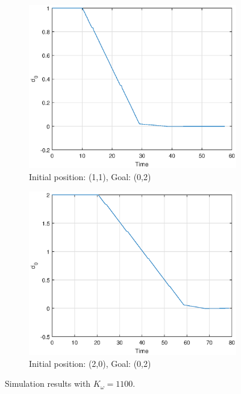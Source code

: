 \begin{figure}[H]
   
    \begin{subfigure}[b]{7cm}
        \includegraphics[width=\textwidth]{task8_d0_initial_11_Goal_02.eps}
        \caption{Initial position: (1,1), Goal: (0,2)}
        \label{fig:d01102}
    \end{subfigure}
     \begin{subfigure}[b]{7cm}
        \includegraphics[width=\textwidth]{task8_d0_initial_20_Goal_02.eps}
        \caption{Initial position: (2,0), Goal: (0,2) }
        \label{fig:d02002}
    \end{subfigure}
    \caption{Simulation results with $K_\omega=1100.$}\label{fig:d02002}
\end{figure}